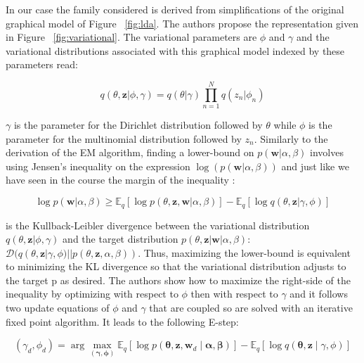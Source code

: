 \documentclass[12pt,a4paper,onecolumn]{article}
\begin{document}
In our case the family considered is derived from simplifications of the original graphical model of Figure ~\ref{fig:lda}. The authors propose the representation given in Figure ~\ref{fig:variational}. The variational parameters are $\phi$ and $\gamma$ and the variational distributions associated with this graphical model indexed by these parameters read:

\begin{equation*}
q(\theta, \mathbf{z}|\phi, \gamma) = q(\theta|\gamma)\prod_{n=1}^N q(z_n|\phi_n)    
\end{equation*}


$\gamma$ is the parameter for the Dirichlet distribution followed by $\theta$ while $\phi$ is the parameter for the multinomial distribution followed by $z_n$. Similarly to the derivation of the EM algorithm, finding a lower-bound on $p(\mathbf{w}|\alpha, \beta)$ involves using Jensen's inequality on the expression $\log (p(\mathbf{w}|\alpha, \beta))$ and just like we have seen in the course the margin of the inequality :

\begin{equation}
    \log p(\mathbf{w}|\alpha, \beta) \geq \mathbb{E}_q[\log p(\theta, \mathbf{z}, \mathbf{w}|\alpha, \beta)] - \mathbb{E}_q[\log q(\theta,\mathbf{z}|\gamma, \phi)] \label{eq_llh}
\end{equation}


 is the Kullback-Leibler divergence between the variational distribution $q(\theta, \mathbf{z}|\phi, \gamma)$ and the target distribution $p(\theta, \mathbf{z}|\mathbf{w}|\alpha, \beta)$: $\mathcal{D}(q(\theta, \mathbf{z}|\gamma, \phi)||p(\theta, \mathbf{z}, \alpha, \beta))$. Thus, maximizing the lower-bound is equivalent to minimizing the KL divergence so that the variational distribution adjusts to the target p as desired. The authors show how to maximize the right-side of the inequality by optimizing with respect to $\phi$ then with respect to $\gamma$ and it follows two update equations of $\phi$
and $\gamma$ that are coupled so are solved with an iterative fixed point algorithm. It leads to the following E-step:

\begin{equation*}
(\gamma_d, \phi_d) = \operatorname{arg}\max_{(\bm{\gamma}, \bm{\phi})} \mathbb{E}_{q}\left[\log p(\bm{\theta},\bm{z}, \bm{w}_d \mid \bm{\alpha}, \bm{\beta})\right] - \mathbb{E}_{q}\left[\log q(\bm{\theta}, \bm{z} \mid \gamma, \phi)\right]              \tag{E-step}    
\end{equation*}
\end{document}
